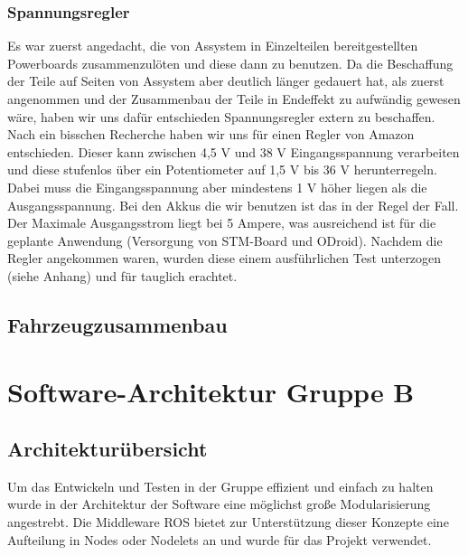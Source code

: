 \documentclass[a4paper, 12pt, titlepage]{scrartcl}
\begin{document}
		\subsubsection*{Spannungsregler}
		Es war zuerst angedacht, die von Assystem in Einzelteilen bereitgestellten Powerboards zusammenzulöten
		und diese dann zu benutzen. Da die Beschaffung der Teile auf Seiten von Assystem aber deutlich länger 
		gedauert hat, als zuerst angenommen und der Zusammenbau der Teile in Endeffekt zu aufwändig gewesen wäre, 
		haben wir uns dafür entschieden Spannungsregler extern zu beschaffen.
		Nach ein bisschen Recherche haben wir uns für einen Regler von Amazon entschieden.
		Dieser kann zwischen 4,5 V und 38 V Eingangsspannung verarbeiten und diese stufenlos über ein 
		Potentiometer auf 1,5 V bis 36 V herunterregeln. Dabei muss die Eingangsspannung aber mindestens 1 V höher 
		liegen als die Ausgangsspannung. Bei den Akkus die wir benutzen ist das in der Regel der Fall. Der 
		Maximale Ausgangsstrom liegt bei 5 Ampere, was ausreichend ist für die geplante Anwendung (Versorgung von 
		STM-Board und ODroid). 
		Nachdem die Regler angekommen waren, wurden diese einem ausführlichen Test unterzogen (siehe Anhang) und 
		für tauglich erachtet. 
		\subsection{Fahrzeugzusammenbau}
		\label{fahrzeugzusammenbau}
	\newpage
	
	\section{Software-Architektur Gruppe B}
	\label{sw_b_architektur}
			\subsection{Architekturübersicht}
			\label{sw_b_uebersicht}
			Um das Entwickeln und Testen in der Gruppe effizient und einfach zu halten wurde in der Architektur der Software eine möglichst große Modularisierung angestrebt. Die Middleware ROS bietet zur Unterstützung dieser Konzepte eine Aufteilung in Nodes oder Nodelets an und wurde für das Projekt verwendet.
			
\end{document}
